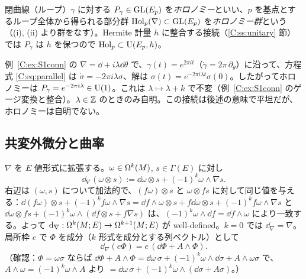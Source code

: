 閉曲線（ループ）$\gamma$ に対する $P_\gamma\in\mathrm{GL}(E_p)$ を\emph{ホロノミー}といい、$p$ を基点とするループ全体から得られる部分群 $\operatorname{Hol}_p(\nabla)\subset\mathrm{GL}(E_p)$ を\emph{ホロノミー群}という（(i), (ii) より群をなす）。Hermite 計量 $h$ に整合する接続（\ref{C:ss:unitary} 節）では $P_\gamma$ は $h$ を保つので $\operatorname{Hol}_p\subset\mathrm{U}(E_p,h)$。

\begin{ex}[$S^1$ 上のホロノミー]\label{C:ex:S1hol}
例~\ref{C:ex:S1conn} の $\nabla=\dd+i\lambda\dd\theta$ で、$\gamma(t)=e^{2\pi it}$（$\dot\gamma=2\pi\,\partial_\theta$）に沿って、方程式 \eqref{C:eq:parallel} は $\dot\sigma=-2\pi i\lambda\sigma$、解は $\sigma(t)=e^{-2\pi i\lambda t}\sigma(0)$。したがってホロノミーは $P_\gamma=e^{-2\pi i\lambda}\in\mathrm{U}(1)$。これは $\lambda\mapsto\lambda+k$ で不変（例~\ref{C:ex:S1conn} のゲージ変換と整合）。$\lambda\in\mathbb Z$ のときのみ自明。この接続は後述の意味で平坦だが、ホロノミーは自明でない。
\end{ex}

\subsection{共変外微分と曲率}
\label{C:ss:curv}
$\nabla$ を $E$ 値形式に拡張する。$\omega\in\Omega^k(M)$, $s\in\Gamma(E)$ に対し
\begin{equation}\label{C:eq:dnabla}
\dd_\nabla(\omega\otimes s):=\dd\omega\otimes s+(-1)^k\omega\wedge\nabla s.
\end{equation}
右辺は $(\omega,s)$ について加法的で、$(f\omega)\otimes s$ と $\omega\otimes fs$ に対して同じ値を与える：$\dd(f\omega)\otimes s+(-1)^kf\omega\wedge\nabla s=\dd f\wedge\omega\otimes s+f\dd\omega\otimes s+(-1)^kf\omega\wedge\nabla s$ と $\dd\omega\otimes fs+(-1)^k\omega\wedge(\dd f\otimes s+f\nabla s)$ は、$(-1)^k\omega\wedge\dd f=\dd f\wedge\omega$ により一致する。よって $\mathrm{d}_\nabla:\Omega^k(M;E)\to\Omega^{k+1}(M;E)$ が well-defined。$k=0$ では $\dd_\nabla=\nabla$。局所枠 $e$ で $\Phi$ を成分（$k$ 形式を成分とする列ベクトル）として
\begin{equation}\label{C:eq:dnablaloc}
\dd_\nabla(e\Phi)=e\,(\dd\Phi+A\wedge\Phi).
\end{equation}
（確認：$\Phi=\omega\sigma$ ならば $\dd\Phi+A\wedge\Phi=\dd\omega\,\sigma+(-1)^k\omega\wedge\dd\sigma+A\wedge\omega\sigma$ で、$A\wedge\omega=(-1)^k\omega\wedge A$ より $=\dd\omega\,\sigma+(-1)^k\omega\wedge(\dd\sigma+A\sigma)$。）

